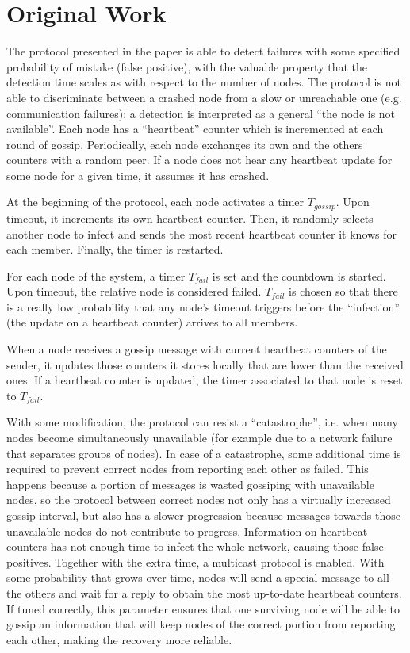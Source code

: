 \section{Original Work}
\label{sec:paper}

The protocol presented in the paper is able to detect failures with some specified probability of mistake (false positive),
with the valuable property that the detection time scales as  with respect to the number of nodes.
The protocol is not able to discriminate between a crashed node from a slow or unreachable one (e.g. communication failures):
a detection is interpreted as a general ``the node is not available''.
Each node has a ``heartbeat'' counter which is incremented at each round of gossip.
Periodically, each node exchanges its own and the others counters with a random peer.
If a node does not hear any heartbeat update for some node for a given time, it assumes it has crashed.

At the beginning of the protocol, each node activates a timer $T_{gossip}$.
Upon timeout, it increments its own heartbeat counter.
Then, it randomly selects another node to infect and sends the most recent heartbeat counter it knows for each member.
Finally, the timer is restarted.

For each node of the system, a timer $T_{fail}$ is set and the countdown is started.
Upon timeout, the relative node is considered failed.
$T_{fail}$ is chosen so that there is a really low probability that any node's timeout triggers before the ``infection'' (the update on a heartbeat counter) arrives to all members.

When a node receives a gossip message with current heartbeat counters of the sender,
it updates those counters it stores locally that are lower than the received ones.
If a heartbeat counter is updated, the timer associated to that node is reset to $T_{fail}$.

With some modification, the protocol can resist a ``catastrophe'', i.e. when many nodes become simultaneously unavailable (for example due to a network failure that separates groups of nodes).
In case of a catastrophe, some additional time is required to prevent correct nodes from reporting each other as failed.
This happens because a portion of messages is wasted gossiping with unavailable nodes, so the protocol between correct nodes not only has a virtually increased gossip interval, but also has a slower progression because messages towards those unavailable nodes do not contribute to progress.
Information on heartbeat counters has not enough time to infect the whole network, causing those false positives.
Together with the extra time, a multicast protocol is enabled.
With some probability that grows over time, nodes will send a special message to all the others and wait for a reply to obtain the most up-to-date heartbeat counters.
If tuned correctly, this parameter ensures that one surviving node will be able to gossip an information that will keep nodes of the correct portion from reporting each other, making the recovery more reliable. 

